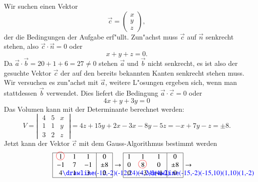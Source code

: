 \begin{beispiel}
{\parindent 0pt Wir suchen einen Vektor}
\[
\vec c=\begin{pmatrix}x\\y\\z\end{pmatrix},
\]
der die Bedingungen der Aufgabe erf"ullt. Zun"achst muss $\vec c$ auf
$\vec n$ senkrecht stehen, also $\vec c\cdot\vec n=0$ oder
\[
x+y+z=0.
\]
Da $\vec a\cdot\vec b=20+1+6=27\ne 0$ stehen $\vec a$ und $\vec b$
nicht senkrecht, es ist also der gesuchte Vektor $\vec c$ der auf den bereits
bekannten Kanten senkrecht stehen muss.
Wir versuchen es zun"achst
mit $\vec a$, weitere L"osungen ergeben sich, wenn man stattdessen $\vec b$
verwendet.
Dies liefert die Bedingung $\vec a\cdot\vec c=0$ oder
\[
4x+y+3y=0
\]
Das Volumen kann mit der Determinante berechnet werden:
\[
V=\left|\;
\begin{matrix}
4&5&x\\
1&1&y\\
3&2&z
\end{matrix}
\;\right|=
4z+15y+2x-3x-8y-5z=-x+7y-z=\pm8.
\]
Jetzt kann der Vektor $\vec c$ mit dem Gauss-Algorithmus bestimmt werden
\begin{align*}
\begin{tabular}{|>{$}c<{$}>{$}c<{$}>{$}c<{$}|>{$}c<{$}|}
\hline
1%
\begin{picture}(0,0)
\color{red}\put(-3,4){\circle{12}}
\end{picture}%
&1&1&0\\
-1&7&-1&\pm8\\
4%
\begin{picture}(0,0)%
\color{blue}\drawline(-12,-2)(-12,24)(4,24)(4,-2)
\end{picture}%
&1&3&0\\
\hline
\end{tabular}
&
\rightarrow
\begin{tabular}{|>{$}c<{$}>{$}c<{$}>{$}c<{$}|>{$}c<{$}|}
\hline
1&1&1&0\\
0&8%
\begin{picture}(0,0)
\color{red}\put(-3,4){\circle{12}}
\end{picture}%
&0&\pm8\\
0&-3%
\begin{picture}(0,0)%
\color{blue}\drawline(-15,-2)(-15,10)(1,10)(1,-2)
\end{picture}%
&-1&0\\
\hline
\end{tabular}
\rightarrow
\begin{tabular}{|>{$}c<{$}>{$}c<{$}>{$}c<{$}|>{$}c<{$}|}

\end{tabular}
\end{align*}
\end{beispiel}
